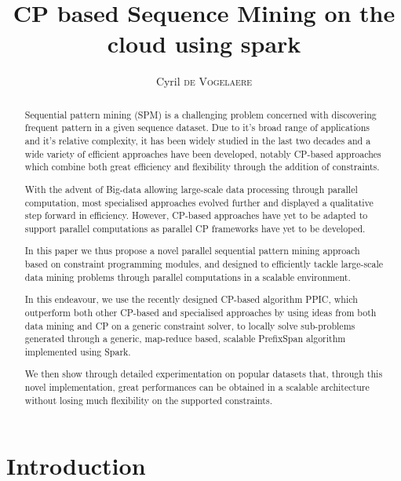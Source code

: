 \documentclass{eplmastersthesis}
\title{CP based Sequence Mining on the cloud using spark}	%
\author{Cyril \textsc{de Vogelaere}}	%
\begin{document}
\begin{singlespacing}
\maketitle					%
\end{singlespacing}

\tableofcontents
\newpage
\listoffigures
\listoftables
\newpage
\listofalgorithms
\newpage

\begin{abstract}

Sequential pattern mining (SPM) is a challenging problem concerned with discovering frequent pattern in a given sequence dataset. Due to it's broad range of applications and it's relative complexity, it has been widely studied in the last two decades and a wide variety of efficient approaches have been developed, notably CP-based approaches which combine both great efficiency and flexibility through the addition of constraints.

With the advent of Big-data allowing large-scale data processing through parallel computation, most specialised approaches evolved further and displayed a qualitative step forward in efficiency. However, CP-based approaches have yet to be adapted to support parallel computations as parallel CP frameworks have yet to be developed.

In this paper we thus propose a novel parallel sequential pattern mining approach based on constraint programming modules, and designed to efficiently tackle large-scale data mining problems through parallel computations in a scalable environment.

In this endeavour, we use the recently designed CP-based algorithm PPIC, which outperform both other CP-based and specialised approaches by using ideas from both data mining and CP on a generic constraint solver, to locally solve sub-problems generated through a generic, map-reduce based, scalable PrefixSpan algorithm implemented using Spark.

We then show through detailed experimentation on popular datasets that, through this novel implementation, great performances can be obtained in a scalable architecture without losing much flexibility on the supported constraints.
\end{abstract}

\section{Introduction}
\end{document}
